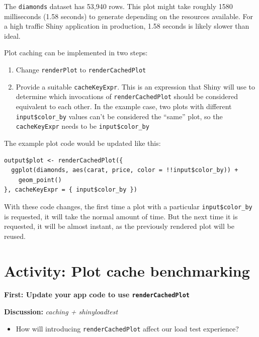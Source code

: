 \documentclass[]{book}
\providecommand{\tightlist}{%
  \setlength{\itemsep}{0pt}\setlength{\parskip}{0pt}}
\theoremstyle{definition}
\theoremstyle{definition}
\theoremstyle{definition}
\theoremstyle{remark}
\begin{document}
The \texttt{diamonds} dataset has 53,940 rows. This plot might take
roughly 1580 milliseconds (1.58 seconds) to generate depending on the
resources available. For a high traffic Shiny application in production,
1.58 seconds is likely slower than ideal.

Plot caching can be implemented in two steps:

\begin{enumerate}
\def\labelenumi{\arabic{enumi}.}
\tightlist
\item
  Change \texttt{renderPlot} to \texttt{renderCachedPlot}
\item
  Provide a suitable \texttt{cacheKeyExpr}. This is an expression that
  Shiny will use to determine which invocations of
  \texttt{renderCachedPlot} should be considered equivalent to each
  other. In the example case, two plots with different
  \texttt{input\$color\_by} values can't be considered the ``same''
  plot, so the \texttt{cacheKeyExpr} needs to be
  \texttt{input\$color\_by}
\end{enumerate}

The example plot code would be updated like this:

\begin{verbatim}
output$plot <- renderCachedPlot({
  ggplot(diamonds, aes(carat, price, color = !!input$color_by)) +
    geom_point()
}, cacheKeyExpr = { input$color_by })
\end{verbatim}

With these code changes, the first time a plot with a particular
\texttt{input\$color\_by} is requested, it will take the normal amount
of time. But the next time it is requested, it will be almost instant,
as the previously rendered plot will be reused.

\hypertarget{activity-plot-cache-benchmarking}{%
\section{Activity: Plot cache
benchmarking}\label{activity-plot-cache-benchmarking}}

\textbf{First: Update your app code to use \texttt{renderCachedPlot}}

\textbf{Discussion:} \emph{caching + shinyloadtest}

\begin{itemize}
\tightlist
\item
  How will introducing \texttt{renderCachedPlot} affect our load test
  experience?
\end{itemize}
\end{document}
